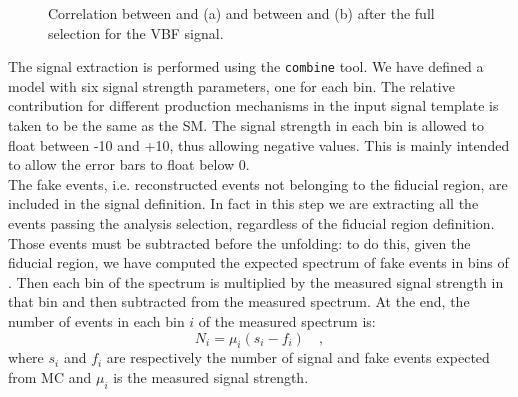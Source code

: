\begin{figure}[htb]
\centering
{}
\caption{Correlation between \pth and \mll (a) and between \pth and \mt (b) after the full selection for the VBF signal.\label{fig:correlation_vbf}}
\end{figure}

The signal extraction is performed using the {\tt combine} tool. 
We have defined a model with six signal strength parameters, one for each bin.
The relative contribution for different production mechanisms in the input signal template is taken to be the same as the SM.
The signal strength in each bin is allowed to float between -10 and +10, thus allowing negative values. This is mainly intended to allow the error bars to float below 0.\\
The fake events, i.e. reconstructed events not belonging to the fiducial region, are included in the signal definition. In fact in this step we are extracting all the events passing the analysis selection, regardless of the fiducial region definition.
Those events must be subtracted before the unfolding: to do this, given the fiducial region, we have computed the expected spectrum of fake events in bins of \pth. Then each bin of the spectrum is multiplied by the measured signal strength in that bin and then subtracted from the measured spectrum.
At the end, the number of events in each bin $i$ of the measured spectrum is:
\begin{equation}
N_i = \mu_i (s_i -f_i) \quad ,
\end{equation}
where $s_i$ and $f_i$ are respectively the number of signal and fake events expected from MC and $\mu_i$ is the measured signal strength.

